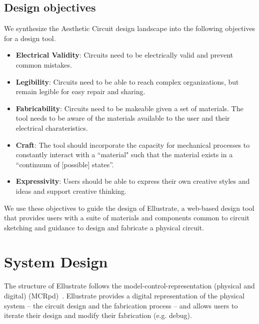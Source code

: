 \documentclass{sigchi}
\begin{document}
\subsection{Design objectives}
  We synthesize the Aesthetic Circuit design landscape into the following objectives for a design tool. 
    \begin{itemize}
        \item {\bf Electrical Validity}: Circuits need to be electrically valid and prevent common mistakes.
        \item {\bf Legibility}: Circuits need to be able to reach complex organizations, but remain legible for easy repair and sharing.
        \item {\bf Fabricability}: Circuits need to be makeable given a set of materials. The tool needs to be aware of the materials available to the user and their electrical charateristics. 
        \item {\bf Craft}: The tool should incorporate the capacity for mechanical processes to constantly interact with a ``material"  such that the material exists in a ``continuum of [possible] states''\cite{mccullough1998abstracting}. 
        \item {\bf Expressivity}: Users should be able to express their own creative styles and ideas and support creative thinking. 
    \end{itemize}
We use these objectives to guide the design of Ellustrate, a web-based design tool that provides users with a suite of materials and components common to circuit sketching and guidance to design and fabricate a physical circuit.

\section{System Design}
The structure of Ellustrate follows the model-control-representation (physical and digital) (MCRpd)~\cite{ullmer2000emerging}. Ellustrate provides a digital representation of the physical system -- the circuit design and the fabrication process -- and allows users to iterate their design and modify their fabrication (e.g. debug). 
\end{document}
